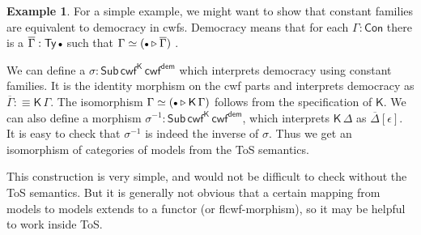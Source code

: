 \documentclass[12pt,a4paper,twoside,openany]{book}
\theoremstyle{remark}
\theoremstyle{definition}
\newtheorem{myexample}{Example}
\theoremstyle{theorem}
\newcommand{\ms}[1]{\mathsf{#1}}
\newcommand{\Con}{\mathsf{Con}}
\newcommand{\Sub}{\mathsf{Sub}}
\newcommand{\Ty}{\mathsf{Ty}}
\newcommand{\ext}{\triangleright}
\newcommand{\emptycon}{\scaleobj{.75}\bullet}
\newcommand{\K}{\mathsf{K}}
\newcommand{\defn}{:\equiv}
\begin{document}
\begin{myexample}
For a simple example, we might want to show that constant families are
equivalent to democracy in cwfs. Democracy means that for each $\Gamma : \Con$
there is a $\overline{\Gamma} : \Ty\,\emptycon$ such that $\Gamma \simeq
(\emptycon\ext\overline{\Gamma})$ \cite[Section~3.1]{flccc-undecidability}.

We can define a $\sigma : \Sub\,\ms{cwf^K}\,\ms{cwf^{dem}}$ which interprets
democracy using constant families. It is the identity morphism on the cwf parts
and interprets democracy as $\overline{\Gamma} \defn \ms{K}\,\Gamma$. The
isomorphism $\Gamma \simeq (\emptycon \ext \K\,\Gamma)$ follows from the
specification of $\K$. We can also define a morphism $\sigma^{-1} :
\Sub\,\ms{cwf^K}\,\ms{cwf^{dem}}$, which interprets $\K\,\Delta$ as
$\overline{\Delta}[\epsilon]$. It is easy to check that $\sigma^{-1}$ is indeed
the inverse of $\sigma$. Thus we get an isomorphism of categories of models
from the ToS semantics.

This construction is very simple, and would not be difficult to check without
the ToS semantics. But it is generally not obvious that a certain mapping from
models to models extends to a functor (or flcwf-morphism), so it may be helpful
to work inside ToS.
\end{myexample}
\end{document}
